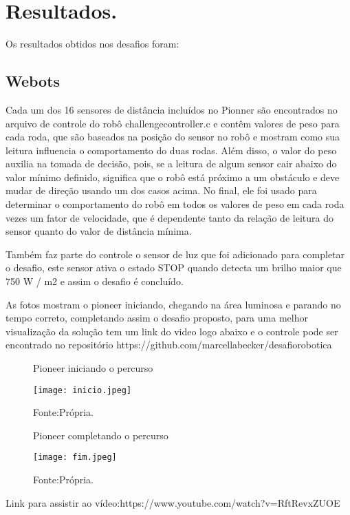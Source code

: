 \chapter{Resultados.}
\label{chap:result}
Os resultados obtidos nos desafios foram:
\section{Webots}

Cada um dos 16 sensores de distância incluídos no Pionner são encontrados no arquivo de controle do robô challengecontroller.c
e contêm valores de peso para cada roda, que são baseados na posição do sensor no robô e mostram como sua leitura influencia o 
comportamento do duas rodas. Além disso, o valor do peso auxilia na tomada de decisão, pois, se a leitura de algum sensor cair 
abaixo do valor mínimo definido, significa que o robô está próximo a um obstáculo e deve mudar de direção usando um dos casos acima. 
No final, ele foi usado para determinar o comportamento do robô em todos os valores de peso em cada roda vezes um fator de velocidade, 
que é dependente tanto da relação de leitura do sensor quanto do valor de distância mínima.

Também faz parte do controle o sensor de luz que foi adicionado para completar o desafio, 
este sensor ativa o estado STOP quando detecta um brilho maior que 750 W / m2 e assim o desafio é concluído.

As fotos mostram o pioneer iniciando, chegando na área luminosa e parando no tempo correto, completando assim o desafio proposto,
para uma melhor visualização da solução tem um link do video logo abaixo e o controle pode ser encontrado no repositório https://github.com/marcellabecker/desafiorobotica 

\begin{figure} [h!]	
    \centering
    \caption{Pioneer iniciando o percurso}
    \texttt{[image: inicio.jpeg]}
    \caption*{Fonte:Própria.}
    \label{fig:inciodopercurso}
\end{figure}

\begin{figure} [h!]	
    \centering
    \caption{Pioneer completando o percurso}
    \texttt{[image: fim.jpeg]}
    \caption*{Fonte:Própria.}
    \label{fig:fimdopercurso}
\end{figure}



Link para assistir ao vídeo:https://www.youtube.com/watch?v=RftRevxZUOE


